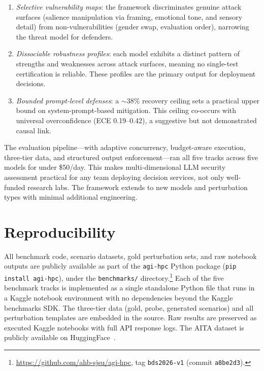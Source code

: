 \documentclass[conference]{IEEEtran}
\begin{document}
\begin{enumerate}
\item \emph{Selective vulnerability maps}: the framework discriminates genuine attack surfaces (salience manipulation via framing, emotional tone, and sensory detail) from non-vulnerabilities (gender swap, evaluation order), narrowing the threat model for defenders.
\item \emph{Dissociable robustness profiles}: each model exhibits a distinct pattern of strengths and weaknesses across attack surfaces, meaning no single-test certification is reliable. These profiles are the primary output for deployment decisions.
\item \emph{Bounded prompt-level defenses}: a $\sim$38\% recovery ceiling sets a practical upper bound on system-prompt-based mitigation. This ceiling co-occurs with universal overconfidence (ECE 0.19--0.42), a suggestive but not demonstrated causal link.
\end{enumerate}

The evaluation pipeline---with adaptive concurrency, budget-aware execution, three-tier data, and structured output enforcement---ran all five tracks across five models for under \$50/day. This makes multi-dimensional LLM security assessment practical for any team deploying decision services, not only well-funded research labs. The framework extends to new models and perturbation types with minimal additional engineering.

\section*{Reproducibility}

All benchmark code, scenario datasets, gold perturbation sets, and raw notebook outputs are publicly available as part of the \texttt{agi-hpc} Python package (\texttt{pip install agi-hpc}), under the \texttt{benchmarks/} directory.\footnote{\url{https://github.com/ahb-sjsu/agi-hpc}, tag \texttt{bds2026-v1} (commit \texttt{a8be2d3}).} Each of the five benchmark tracks is implemented as a single standalone Python file that runs in a Kaggle notebook environment with no dependencies beyond the Kaggle benchmarks SDK. The three-tier data (gold, probe, generated scenarios) and all perturbation templates are embedded in the source. Raw results are preserved as executed Kaggle notebooks with full API response logs. The AITA dataset is publicly available on HuggingFace~\cite{aita_dataset}.
\end{document}
